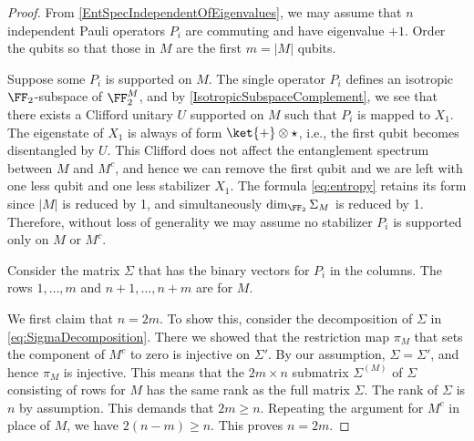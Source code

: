 \begin{proof}
From \ref{EntSpecIndependentOfEigenvalues},
we may assume that $n$ independent Pauli operators $P_i$ are commuting and
have eigenvalue $+1$.
Order the qubits so that those in $M$ are the first $m = |M|$ qubits.

Suppose some $P_i$ is supported on $M$.
The single operator $P_i$ defines an isotropic $\FF_2$-subspace of $\FF_2^M$,
and by \ref{IsotropicSubspaceComplement},
we see that there exists a Clifford unitary $U$ supported on $M$
such that $P_i$ is mapped to $X_1$.
The eigenstate of $X_1$ is always of form $\ket{+} \otimes \star $,
i.e., the first qubit becomes disentangled by $U$.
This Clifford does not affect the entanglement spectrum between $M$ and $M^c$,
and hence we can remove the first qubit and we are left with one less qubit
and one less stabilizer $X_1$.
The formula \eqref{eq:entropy} retains its form since $|M|$ is reduced by 1,
and simultaneously $\dim_{\FF_2} \Sigma_M$ is reduced by 1.
Therefore, without loss of generality we may assume no stabilizer $P_i$
is supported only on $M$ or $M^c$.

Consider the matrix $\Sigma$ that has the binary vectors for $P_i$ in the columns.
The rows $1,\ldots, m$ and $n+1, \ldots, n+m$ are for $M$.

We first claim that $n = 2m$.
To show this, consider the decomposition of $\Sigma$ in \eqref{eq:SigmaDecomposition}.
There we showed that the restriction map $\pi_M$ that sets the component of $M^c$ to zero
is injective on $\Sigma'$. By our assumption, $\Sigma = \Sigma'$,
and hence $\pi_M$ is injective.
This means that the $2m \times n$ submatrix $\Sigma^{(M)}$ of $\Sigma$ consisting of rows for $M$
has the same rank as the full matrix $\Sigma$.
The rank of $\Sigma$ is $n$ by assumption.
This demands that $2m \ge n$.
Repeating the argument for $M^c$ in place of $M$, we have $2(n-m) \ge n$.
This proves $n = 2m$.


\end{proof}
